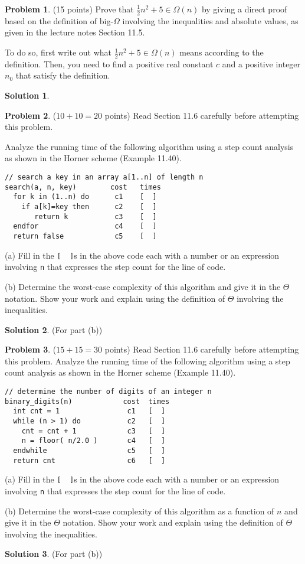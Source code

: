 \documentclass{article}
\theoremstyle{definition}
\newtheorem{problem}{Problem}
\newtheorem*{solution}{Solution}
\begin{document}
\newpage
\begin{problem} (15 points) 
Prove that $\frac{1}{2}n^2+5 \in \Omega(n)$ by giving a direct proof based on the 
definition of big-$\Omega$ involving the inequalities and absolute values, as given 
in the lecture notes Section 11.5.

To do so, first write out what $\frac{1}{2}n^2+5 \in \Omega(n)$ means according 
to the definition. Then, you need to find a positive real constant $c$ and a positive 
integer $n_0$ that satisfy the definition.
\end{problem}
\begin{solution}
\end{solution}

\newpage
\begin{problem} ($10+10=20$ points) Read Section 11.6 carefully before attempting 
this problem.

Analyze the running time of the following algorithm using a step count analysis 
as shown in the Horner scheme (Example 11.40).  
\begin{verbatim}
// search a key in an array a[1..n] of length n
search(a, n, key)        cost   times
  for k in (1..n) do      c1    [  ]   
    if a[k]=key then      c2    [  ]
       return k           c3    [  ]
  endfor                  c4    [  ]
  return false            c5    [  ]
\end{verbatim}
(a) Fill in the \verb|[  ]|s in the above code each with a number or an expression involving
\verb|n| that expresses the step count for the line of code.

\medskip
\noindent
(b) Determine the worst-case complexity of this algorithm and give it in the $\Theta$ notation.
Show your work and explain using the definition of $\Theta$ involving the inequalities. 
\end{problem}
\begin{solution} (For part (b))
\end{solution}

\newpage
\begin{problem} ($15+15=30$ points) Read Section 11.6 carefully before attempting this problem.
Analyze the running time of the following algorithm using a step count analysis 
as shown in the Horner scheme (Example 11.40).
\begin{verbatim}
// determine the number of digits of an integer n
binary_digits(n)            cost  times
  int cnt = 1                c1   [  ]
  while (n > 1) do           c2   [  ]
    cnt = cnt + 1            c3   [  ]
    n = floor( n/2.0 )       c4   [  ]
  endwhile                   c5   [  ]
  return cnt                 c6   [  ]
\end{verbatim}
\noindent
(a) Fill in the \verb|[  ]|s in the above code each with a number or an expression involving
\verb|n| that expresses the step count for the line of code.

\medskip
\noindent
(b) Determine the worst-case complexity of this algorithm as a function of $n$
and give it in the $\Theta$ notation.
Show your work and explain using the definition of $\Theta$ involving the inequalities. 
\end{problem}
\begin{solution} (For part (b))
\end{solution}
\end{document}
